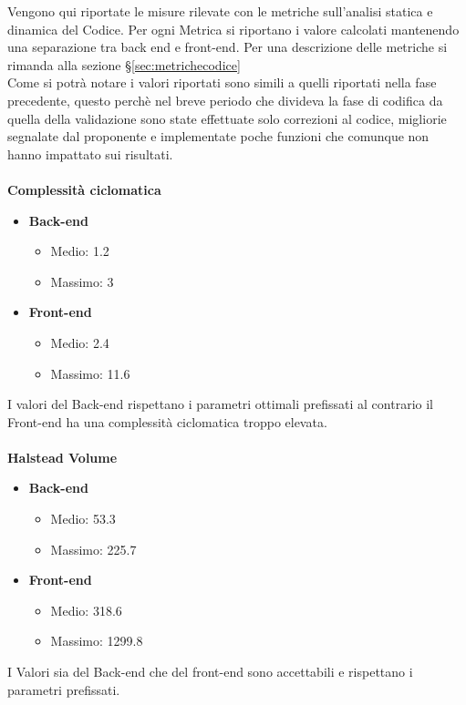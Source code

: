 Vengono qui riportate le misure rilevate con le metriche sull’analisi statica e dinamica del Codice. Per ogni Metrica si riportano i valore calcolati mantenendo una separazione tra back end e front-end. Per una descrizione delle metriche si rimanda alla sezione \S\ref{sec:metrichecodice}\\
Come si potrà notare i valori riportati sono simili a quelli riportati nella fase precedente, questo perchè nel breve periodo che divideva la fase di codifica da quella della validazione sono state effettuate solo correzioni al codice, migliorie segnalate dal proponente e implementate poche funzioni che comunque non hanno impattato sui risultati.\\\\
\textbf{Complessità ciclomatica}
\begin{itemize}
\item \textbf{Back-end}
\begin{itemize}
\item Medio: 1.2
\item Massimo: 3
\end{itemize}
\item \textbf{Front-end}
\begin{itemize}
\item Medio: 2.4
\item Massimo: 11.6
\end{itemize}
\end{itemize}
I valori del Back-end rispettano i parametri ottimali prefissati al contrario il Front-end ha una complessità ciclomatica troppo elevata.
\\\\
\textbf{Halstead Volume}
\begin{itemize}
\item \textbf{Back-end}
\begin{itemize}
\item Medio: 53.3
\item Massimo: 225.7
\end{itemize}
\item \textbf{Front-end}
\begin{itemize}
\item Medio: 318.6
\item Massimo: 1299.8
\end{itemize}
\end{itemize}
I Valori sia del Back-end che del front-end sono accettabili e rispettano i parametri prefissati.

